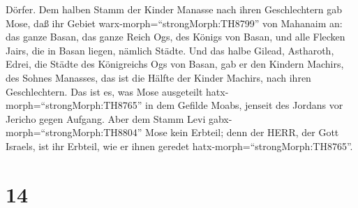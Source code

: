 Dörfer.  Dem halben Stamm der Kinder Manasse nach ihren
Geschlechtern gab Mose,  daß ihr Gebiet
warx-morph=``strongMorph:TH8799'' von Mahanaim an: das ganze Basan, das
ganze Reich Ogs, des Königs von Basan, und alle Flecken Jairs, die in
Basan liegen, nämlich Städte.  Und das halbe Gilead,
Astharoth, Edrei, die Städte des Königreichs Ogs von Basan, gab er den
Kindern Machirs, des Sohnes Manasses, das ist die Hälfte der Kinder
Machirs, nach ihren Geschlechtern.  Das ist es, was Mose
ausgeteilt hatx-morph=``strongMorph:TH8765'' in dem Gefilde Moabs,
jenseit des Jordans vor Jericho gegen Aufgang.  Aber dem
Stamm Levi gabx-morph=``strongMorph:TH8804'' Mose kein Erbteil; denn der
HERR, der Gott Israels, ist ihr Erbteil, wie er ihnen geredet
hatx-morph=``strongMorph:TH8765''.

\hypertarget{section-13}{%
\section{14}\label{section-13}}

